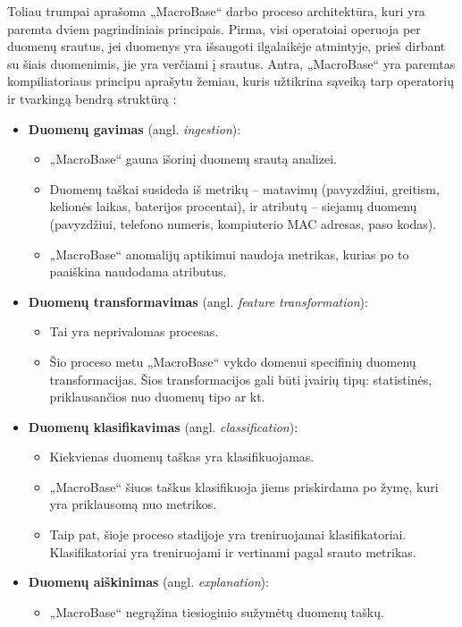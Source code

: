 \documentclass{VUMIFPSbakalaurinis}
\begin{document}
Toliau trumpai aprašoma „MacroBase“ darbo proceso architektūra, kuri yra paremta dviem pagrindiniais principais. Pirma, visi operatoiai operuoja per duomenų srautus, jei duomenys yra išsaugoti ilgalaikėje atmintyje, prieš dirbant su šiais duomenimis, jie yra verčiami į srautus. Antra, „MacroBase“ yra paremtas kompiliatoriaus principu aprašytu žemiau, kuris užtikrina sąveiką tarp operatorių ir tvarkingą bendrą struktūrą \cite{macrobase_overview}:
\begin{itemize}
	\item \textbf{Duomenų gavimas} (angl. \textit{ingestion}):
		\begin{itemize}
			\item „MacroBase“ gauna išorinį duomenų srautą analizei.
			\item Duomenų taškai susideda iš metrikų – matavimų (pavyzdžiui, greitism, kelionės laikas, baterijos procentai), ir atributų – siejamų duomenų (pavyzdžiui, telefono numeris, kompiuterio MAC adresas, paso kodas).
			\item „MacroBase“ anomalijų aptikimui naudoja metrikas, kurias po to paaiškina naudodama atributus.
		\end{itemize}
	\item \textbf{Duomenų transformavimas} (angl. \textit{feature transformation}):
		\begin{itemize}
			\item Tai yra neprivalomas procesas.
			\item Šio proceso metu „MacroBase“ vykdo domenui specifinių duomenų transformacijas. Šios transformacijos gali būti įvairių tipų: statistinės, priklausančios nuo duomenų tipo ar kt.
		\end{itemize}
	\item \textbf{Duomenų klasifikavimas} (angl. \textit{classification}):
		\begin{itemize}
			\item Kiekvienas duomenų taškas yra klasifikuojamas.
			\item „MacroBase“ šiuos taškus klasifikuoja jiems priskirdama po žymę, kuri yra priklausomą nuo metrikos.
			\item Taip pat, šioje proceso stadijoje yra treniruojamai klasifikatoriai. Klasifikatoriai yra treniruojami ir vertinami pagal srauto metrikas.
		\end{itemize}
	\item \textbf{Duomenų aiškinimas} (angl. \textit{explanation}):
		\begin{itemize}
			\item „MacroBase“ negrąžina tiesioginio sužymėtų duomenų taškų.

\end{itemize}
\end{itemize}
\end{document}
